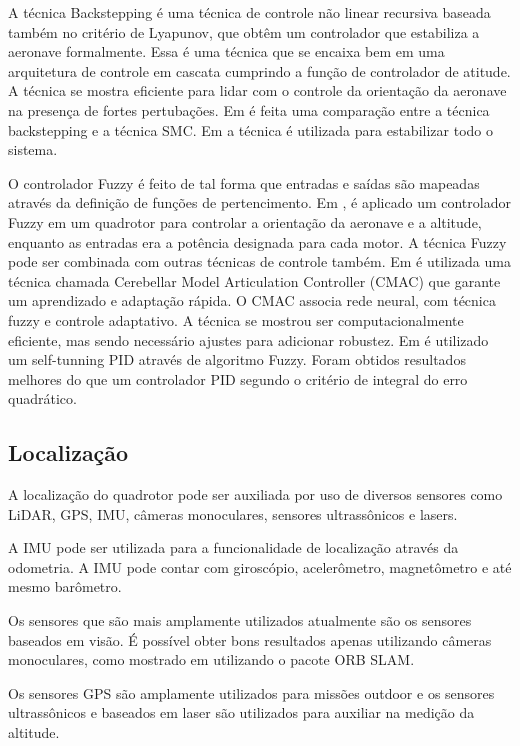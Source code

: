 A técnica Backstepping é uma técnica de controle não linear recursiva baseada também no critério de Lyapunov, que obtêm um controlador que estabiliza a aeronave formalmente. Essa é uma técnica que se encaixa bem em uma arquitetura de controle em cascata cumprindo a função de controlador de atitude. A técnica se mostra eficiente para lidar com o controle da orientação da aeronave na presença de fortes pertubações. Em \cite{bouabdallah2005backstepping} é feita uma comparação entre a técnica backstepping e a técnica SMC. Em \cite{madani2006backstepping} a técnica é utilizada para estabilizar todo o sistema.

O controlador Fuzzy é feito de tal forma que entradas e saídas são mapeadas através da definição de funções de pertencimento. Em \cite{santos2010intelligent}, é aplicado um controlador Fuzzy em um quadrotor para controlar a orientação da aeronave e a altitude, enquanto as entradas era a potência designada para cada motor. A técnica Fuzzy pode ser combinada com outras técnicas de controle também. Em \cite{nicol2008robust} é utilizada uma técnica chamada Cerebellar Model Articulation Controller  (CMAC) que garante um aprendizado e adaptação rápida. O CMAC associa rede neural, com técnica fuzzy e controle adaptativo. A técnica se mostrou ser computacionalmente eficiente, mas sendo necessário ajustes para adicionar robustez. Em \cite{gautam2013control} é utilizado um self-tunning PID através de algoritmo Fuzzy. Foram obtidos resultados melhores do que um controlador PID segundo o critério de integral do erro quadrático.

\subsection{Localização}
A localização do quadrotor pode ser auxiliada por uso de diversos sensores como LiDAR, GPS, IMU, câmeras monoculares, sensores ultrassônicos e lasers.

A IMU pode ser utilizada para a funcionalidade de localização através da odometria. A IMU pode contar com giroscópio, acelerômetro, magnetômetro e até mesmo barômetro.

Os sensores que são mais amplamente utilizados atualmente são os sensores baseados em visão. É possível obter bons resultados apenas utilizando câmeras monoculares, como mostrado em \cite{mur2015orb} utilizando o pacote ORB SLAM.

Os sensores GPS são amplamente utilizados para missões outdoor e os sensores ultrassônicos e baseados em laser são utilizados para auxiliar na medição da altitude.

